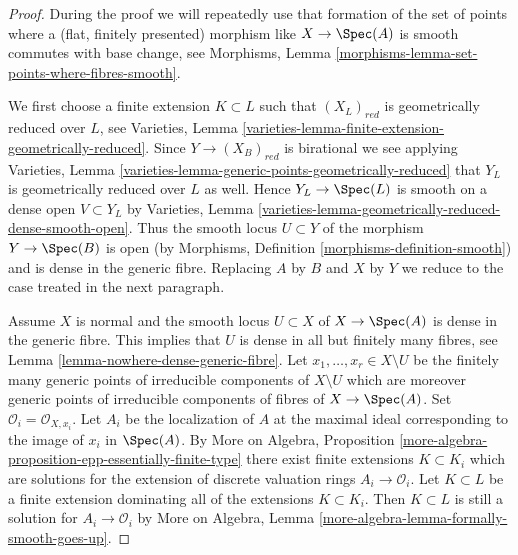 \begin{proof}
During the proof we will repeatedly use that formation of the set of points
where a (flat, finitely presented) morphism like $X \to \Spec(A)$ is
smooth commutes with base change, see
Morphisms, Lemma \ref{morphisms-lemma-set-points-where-fibres-smooth}.

\medskip\noindent
We first choose a finite extension $K \subset L$ such that
$(X_L)_{red}$ is geometrically reduced over $L$, see
Varieties, Lemma \ref{varieties-lemma-finite-extension-geometrically-reduced}.
Since $Y \to (X_B)_{red}$ is birational we see applying
Varieties, Lemma \ref{varieties-lemma-generic-points-geometrically-reduced}
that $Y_L$ is geometrically reduced over $L$ as well.
Hence $Y_L \to \Spec(L)$ is smooth on a dense open $V \subset Y_L$ by
Varieties, Lemma \ref{varieties-lemma-geometrically-reduced-dense-smooth-open}.
Thus the smooth locus $U \subset Y$ of the morphism $Y \to \Spec(B)$
is open (by Morphisms, Definition \ref{morphisms-definition-smooth})
and is dense in the generic fibre. Replacing $A$ by $B$ and $X$ by $Y$
we reduce to the case treated in the next paragraph.

\medskip\noindent
Assume $X$ is normal and the smooth locus $U \subset X$ of $X \to \Spec(A)$
is dense in the generic fibre. This implies that $U$ is dense in all but
finitely many fibres, see Lemma \ref{lemma-nowhere-dense-generic-fibre}.
Let $x_1, \ldots, x_r \in X \setminus U$ be the finitely many generic
points of irreducible components of $X \setminus U$ which are moreover
generic points of irreducible components of fibres of $X \to \Spec(A)$.
Set $\mathcal{O}_i = \mathcal{O}_{X, x_i}$. Let $A_i$ be the localization of
$A$ at the maximal ideal corresponding to the image of $x_i$ in $\Spec(A)$.
By
More on Algebra, Proposition
\ref{more-algebra-proposition-epp-essentially-finite-type}
there exist finite extensions
$K \subset K_i$ which are solutions for the extension of discrete valuation
rings $A_i \to \mathcal{O}_i$. Let $K \subset L$ be a finite extension
dominating all of the extensions $K \subset K_i$. Then $K \subset L$
is still a solution for $A_i \to \mathcal{O}_i$ by
More on Algebra, Lemma \ref{more-algebra-lemma-formally-smooth-goes-up}.


\end{proof}
